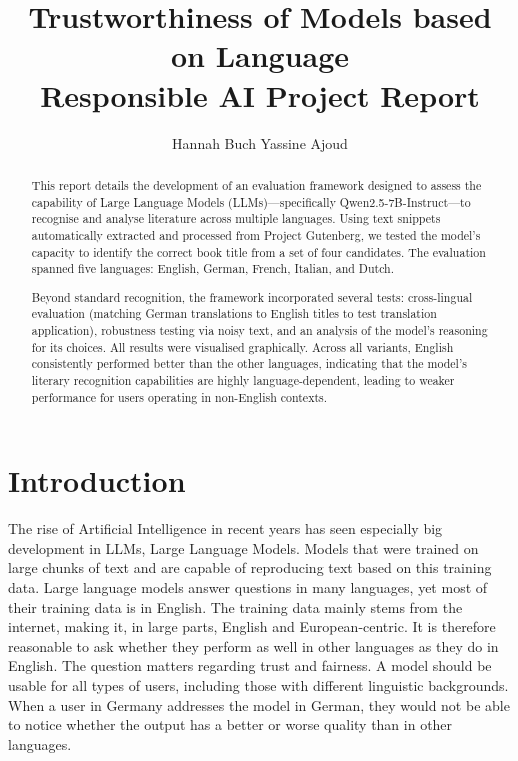 \documentclass[11pt]{article}
\title{\vspace{-1em}\textbf{Trustworthiness of Models based on Language}\\
  \vspace{1em}
  \normalsize{\normalfont Responsible AI Project Report}}
\author{
  Hannah Buch \quad Yassine Ajoud\\
}
\date{}
\begin{document}
\maketitle

\begin{abstract}
This report details the development of an evaluation framework designed to assess the capability of Large Language Models (LLMs)—specifically Qwen2.5-7B-Instruct—to recognise and analyse literature across multiple languages. Using text snippets automatically extracted and processed from Project Gutenberg, we tested the model's capacity to identify the correct book title from a set of four candidates. The evaluation spanned five languages: English, German, French, Italian, and Dutch. 

Beyond standard recognition, the framework incorporated several tests: cross-lingual evaluation (matching German translations to English titles to test translation application), robustness testing via noisy text, and an analysis of the model's reasoning for its choices. All results were visualised graphically. Across all variants, English consistently performed better than the other languages, indicating that the model's literary recognition capabilities are highly language-dependent, leading to weaker performance for users operating in non-English contexts.
\end{abstract}

\section{Introduction}
The rise of Artificial Intelligence in recent years has seen especially big development in LLMs, Large Language Models. Models that were trained on large chunks of text and are capable of reproducing text based on this training data. Large language models answer questions in many languages, yet most of their training data is in English. The training data mainly stems from the internet, making it, in large parts, English and European-centric. It is therefore reasonable to ask whether they perform as well in other languages as they do in English. The question
matters regarding trust and fairness. A model should be usable for all types of users, including those with different linguistic backgrounds. When a user in Germany addresses the model in German, they would not be able to notice whether the output has a better or worse quality than in other languages. 
\end{document}
